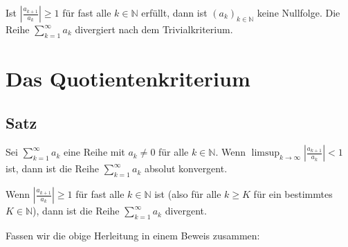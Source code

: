 \documentclass[fontsize=9pt,
               parskip=half-,
               DIV=14,
               listof=chapterentry,
               tocflat]{scrbook}
\begin{document}
\begin{importantparagraph*}
Ist $\left|{\tfrac {a_{k+1}}{a_{k}}}\right|\geq 1$ für fast alle $k\in \mathbb {N} $ erfüllt, dann ist $\left(a_{k}\right)_{k\in \mathbb {N} }$ keine Nullfolge. Die Reihe $\sum _{k=1}^{\infty }a_{k}$ divergiert nach dem Trivialkriterium.

\end{importantparagraph*}
\clearpage
\section{Das Quotientenkriterium}

\subsection{Satz}

\begin{theorem*}
Sei $\sum _{k=1}^{\infty }a_{k}$ eine Reihe mit $a_{k}\neq 0$ für alle $k\in \mathbb {N} $. Wenn $\limsup _{k\to \infty }\left|{\tfrac {a_{k+1}}{a_{k}}}\right|<1$ ist, dann ist die Reihe $\sum _{k=1}^{\infty }a_{k}$ absolut konvergent.

Wenn $\left|{\tfrac {a_{k+1}}{a_{k}}}\right|\geq 1$ für fast alle $k\in \mathbb {N} $ ist (also für alle $k\geq K$ für ein bestimmtes $K\in \mathbb {N} $), dann ist die Reihe $\sum _{k=1}^{\infty }a_{k}$ divergent.

\end{theorem*}

\begin{explanation*}
Fassen wir die obige Herleitung in einem Beweis zusammen:

\end{explanation*}
\end{document}
